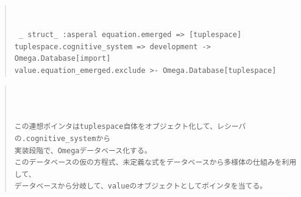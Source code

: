 \documentclass{jsarticle}
\begin{document}
\begin{quote}
\setlength{\baselineskip}{12pt}
\begin{verbatim}


 _ struct_ :asperal equation.emerged => [tuplespace]
tuplespace.cognitive_system => development -> Omega.Database[import]	
value.equation_emerged.exclude >- Omega.Database[tuplespace]
\end{verbatim}
\end{quote}

\begin{quote}
\setlength{\baselineskip}{12pt}
\begin{verbatim}



この連想ポインタはtuplespace自体をオブジェクト化して、レシーバの.cognitive_systemから
実装段階で、Omegaデータベース化する。
このデータベースの仮の方程式、未定義な式をデータベースから多様体の仕組みを利用して、
データベースから分岐して、valueのオブジェクトとしてポインタを当てる。

\end{verbatim}
\end{quote}
\end{document}
